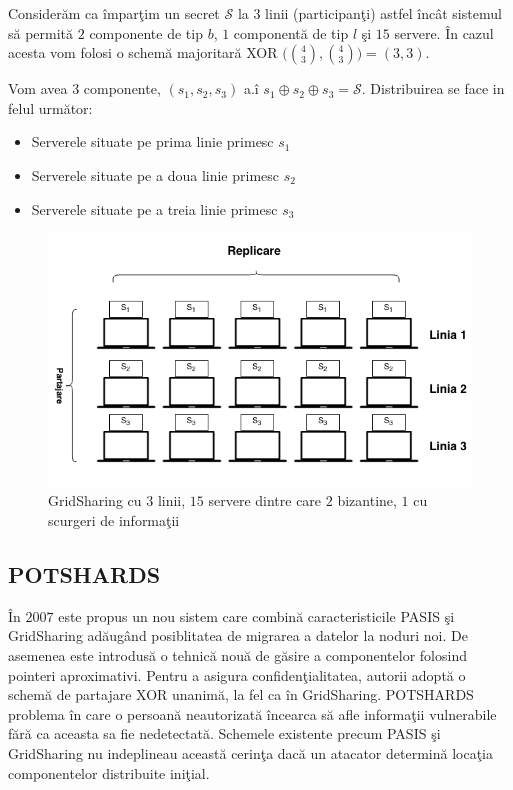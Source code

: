 \documentclass{llncs}
\newcommand{\todo}[1]{{\color{red}{TODO #1}}}
\begin{document}
\begin{example}
	Consider\u{a}m ca \^{i}mpar\c{t}im un secret $\mathcal{S}$ la $3$ linii (participan\c{t}i) astfel \^{i}nc\^{a}t sistemul s\u{a} permit\u{a} $2$ componente de tip $b$, $1$ component\u{a} de tip $l$ \c{s}i $15$ servere. \^{I}n cazul acesta vom folosi o schem\u{a} majoritar\u{a} XOR $\big( {4 \choose 3}, {4 \choose 3}\big) = (3,3)$.

	Vom avea $3$ componente, $(s_1, s_2, s_3)$ a.\^{i} $s_1 \oplus s_2 \oplus s_3 = \mathcal{S}$.
	Distribuirea se face in felul urm\u{a}tor:
	\begin{itemize}
		\item Serverele situate pe prima linie primesc $s_1$
		\item Serverele situate pe a doua linie primesc $s_2$
		\item Serverele situate pe a treia linie primesc $s_3$
	\end{itemize}
\end{example}

\begin{figure}
	\includegraphics[width=12cm]{img/GridSharing.png}    %
	\caption{GridSharing cu $3$ linii, $15$ servere dintre care $2$ bizantine, $1$ cu scurgeri de informa\c{t}ii}
	\label{fig:grid_sharing}
	\bigskip
\end{figure}

\subsection{POTSHARDS} 
\label{sec:desc_potshards}
\^{I}n $2007$ este propus un nou sistem care combin\u{a} caracteristicile PASIS \c{s}i GridSharing ad\u{a}ug\^{a}nd posiblitatea de migrarea a datelor la noduri noi.
De asemenea este introdus\u{a} o tehnic\u{a} nou\u{a} de g\u{a}sire a componentelor folosind pointeri aproximativi. Pentru a asigura confiden\c{t}ialitatea, autorii adopt\u{a} o schem\u{a} de partajare XOR unanim\u{a}, la fel ca \^{i}n GridSharing.
POTSHARDS \todo{readreseaz\u{a}} problema \^{i}n care o persoan\u{a} neautorizat\u{a} \^{i}ncearca s\u{a} afle informa\c{t}ii vulnerabile f\u{a}r\u{a} ca aceasta sa fie nedetectat\u{a}. Schemele existente precum PASIS \c{s}i GridSharing nu indeplineau aceast\u{a} cerin\c{t}a dac\u{a} un atacator determin\u{a} loca\c{t}ia componentelor distribuite ini\c{t}ial.
\end{document}
